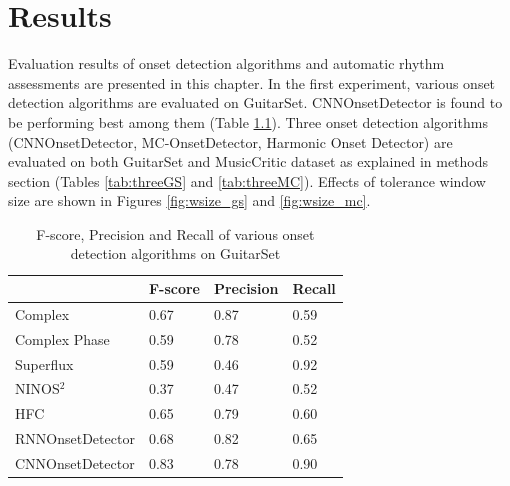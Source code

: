 \chapter{Results}

Evaluation results of onset detection algorithms and automatic rhythm assessments are presented in this chapter. In the first experiment, various onset detection algorithms are evaluated on GuitarSet. CNNOnsetDetector is found to be performing best among them (Table \ref{tab:GSothers}). Three onset detection algorithms (CNNOnsetDetector, MC-OnsetDetector, Harmonic Onset Detector) are evaluated on both GuitarSet and MusicCritic dataset as explained in methods section (Tables \ref{tab:threeGS} and \ref{tab:threeMC}). Effects of tolerance window size are shown in Figures \ref{fig:wsize_gs} and \ref{fig:wsize_mc}.
\begin{table}
 \begin{center}
 \begin{tabular}{|l|l|l|l|}
  \hline
     & F-score & Precision & Recall \\
  \hline
  Complex & 0.67  & 0.87 & 0.59 \\
  Complex Phase & 0.59 & 0.78 & 0.52  \\
  Superflux & 0.59 & 0.46 & 0.92  \\
  NINOS$^2$ & 0.37 & 0.47 & 0.52  \\
  HFC & 0.65 & 0.79 & 0.60  \\
  RNNOnsetDetector & 0.68 & 0.82 & 0.65 \\
  CNNOnsetDetector & 0.83 & 0.78 & 0.90 \\
  \hline
 \end{tabular}
\end{center}
 \caption{F-score, Precision and Recall of various onset detection algorithms on GuitarSet}
 \label{tab:GSothers}
\end{table}


